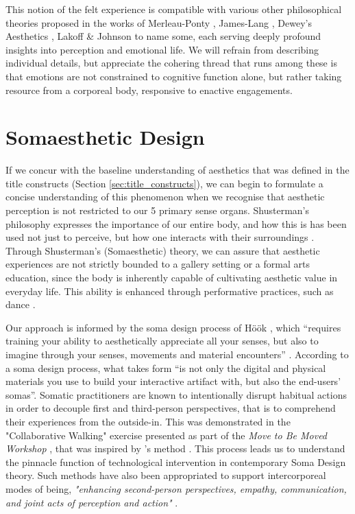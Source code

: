 This notion of the felt experience is compatible with various other philosophical theories proposed in the works of Merleau-Ponty \cite{merleau-ponty_phenomenology_2012}, James-Lang \cite{cannon_james-lange_1927}, Dewey's Aesthetics \cite{dewey_aesthetic_1950}, Lakoff \& Johnson \cite{lakoff_philosophy_1999} to name some, each serving deeply profound insights into perception and emotional life. We will refrain from describing individual details, but appreciate the cohering thread that runs among these is that emotions are not constrained to cognitive function alone, but rather taking resource from a corporeal body, responsive to enactive engagements.

\section{Somaesthetic Design}

If we concur with the baseline understanding of aesthetics that was defined in the title constructs (Section \ref{sec:title_constructs}), we can begin to formulate a concise understanding of this phenomenon when we recognise that aesthetic perception is not restricted to our 5 primary sense organs. Shusterman's philosophy expresses the importance of our entire body, and how this is has been used not just to perceive, but how one interacts with their surroundings \cite{shusterman_body_2008}. Through Shusterman’s (Somaesthetic) theory, we can assure that aesthetic experiences are not strictly bounded to a gallery setting or a formal arts education, since the body is inherently capable of cultivating aesthetic value in everyday life. This ability is enhanced through performative practices, such as dance \cite{eric_c_mullis_performative_2006,shusterman_body_2012}.

Our approach is informed by the soma design process of Höök \cite{hook_designing_2018}, which “requires training your ability to aesthetically appreciate all your senses, but also to imagine through your senses, movements and material encounters” \cite{hook_soma_2019}. According to a soma design process, what takes form “is not only the digital and physical materials you use to build your interactive artifact with, but also the end-users’ somas”. Somatic practitioners are known to intentionally disrupt habitual actions in order to decouple first and third-person perspectives, that is to comprehend their experiences from the outside-in. This was demonstrated in the "Collaborative Walking" exercise presented as part of the \textit{Move to Be Moved Workshop} \cite{hook_embracing_2018}, that was inspired by \citeauthor{loke_moving_2013}'s method \cite{loke_moving_2013}. This process leads us to understand the pinnacle function of technological intervention in contemporary Soma Design theory. Such methods have also been appropriated to support intercorporeal modes of being, \textit{"enhancing second-person perspectives, empathy, communication, and joint acts of perception and action"} \cite{turmo_vidal_designing_2021}.

